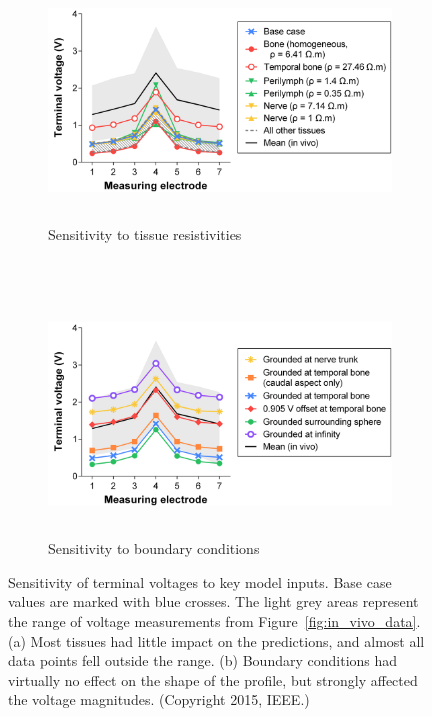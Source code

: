 \begin{figure}
	\centering
	
	\begin{subfigure}[t]{\textwidth}
        \centering
        \includegraphics[height=6.4cm]{Validation/voltage_sensitivity_TR}
        \caption{Sensitivity to tissue resistivities}
        \label{fig:voltage_sensitivity_TR}
    \end{subfigure}\\%
    \vspace{1em}%
    \begin{subfigure}[t]{\textwidth}
        \centering
        \includegraphics[height=6.4cm]{Validation/voltage_sensitivity_BC}
        \caption{Sensitivity to boundary conditions}
        \label{fig:voltage_sensitivity_BC}
    \end{subfigure}%
    
    \caption[Sensitivity of terminal voltages]{Sensitivity of terminal voltages
    to key model inputs. Base case values are marked with blue crosses.
    The light grey areas represent the range of \invivo{} voltage measurements
    from Figure~\ref{fig:in_vivo_data}. (a) Most tissues had little impact on
    the \insilico{} predictions, and almost all data points fell outside the
    \invivo{} range. (b) Boundary conditions had virtually no effect on the
    shape of the profile, but strongly affected the voltage magnitudes. (Copyright
	\textcopyright{} 2015, IEEE.)}
	\label{fig:voltage_sensitivity}
\end{figure}

